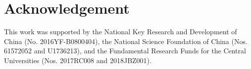 \documentclass[review,3p,10pt,sort&compress]{elsarticle}
\begin{document}
\section*{Acknowledgement}
This work was supported by the National Key Research and Development of China (No. 2016YF-B0800404), the National Science Foundation of China (Nos. 61572052 and U1736213), and the Fundamental Research Funds for the Central Universities (Nos. 2017RC008 and 2018JBZ001).




\end{document}
